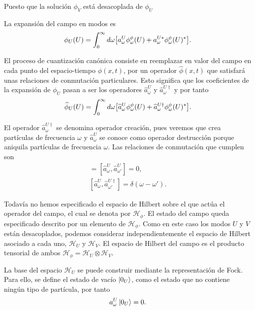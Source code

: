 Puesto que la solución $\phi_V$ está desacoplada de $\phi_U$

La expansión del campo en modos es
\begin{equation}
\phi_U(U) = \int_0^\infty d\omega \qty[a_\omega^U \phi_\omega^\phi (U)+a_\omega^{U*} \phi_\omega^\phi (U)^*].
\end{equation}

El proceso de cuantización canónica consiste en reemplazar en valor del campo en cada
punto del espacio-tiempo $\phi(x,t)$, por un operador $\widehat \phi(x,t)$ que satisfará unas
relaciones de conmutación particulares. 
Esto significa que los coeficientes de la expansión de $\phi_U$ pasan a ser los operadores
$\widehat a_\omega^U$ y $\widehat a_\omega^{U\dagger}$ y por tanto
\begin{equation}
  \widehat \phi_U(U) = \int_0^\infty d\omega \qty[\widehat a_\omega^U\phi_\omega^\phi (U)+\widehat a_\omega^{U\dagger} \phi_\omega^\phi (U)^*].
\end{equation}

El operador $\widehat a_\omega^{U\dagger}$ se denomina operador creación, pues veremos que crea 
partículas de frecuencia $\omega$ y $\widehat a_\omega^U$ se conoce como operador destrucción porque
aniquila partículas de frecuencia $\omega$.
Las relaciones de conmutación que cumplen son
\begin{gather}
  [\widehat a_\omega^{U\dagger},\widehat a_{\omega'}^{U\dagger}]=[\widehat a_\omega^U,\widehat a_{\omega'}^U]=0, \\
  [\widehat a_\omega^U,\widehat a_{\omega'}^{U\dagger}]=\delta(\omega-\omega').
\end{gather}

Todavía no hemos especificado el espacio de Hilbert sobre el que actúa el operador del campo, el cual
se denota por $\mathcal H_\phi$. 
El estado del campo queda especificado descrito por un elemento de $\mathcal H_\phi$.
Como en este caso los modos $U$ y $V$ están desacoplados, podemos considerar independientemente el espacio
de Hilbert asociado a cada uno, $\mathcal H_U$ y $\mathcal H_V$.
El espacio de Hilbert del campo es el producto tensorial de ambos $\mathcal H_\phi=\mathcal H_U\otimes \mathcal H_V$.

La base del espacio $\mathcal H_U$ se puede construir mediante la representación de Fock. 
Para ello, se define el estado de vacío $\ket{0_U}$, como el estado que no contiene ningún tipo
de partícula, por tanto
\begin{equation}
  a^U_\omega \ket{0_U} = 0.
\end{equation}

